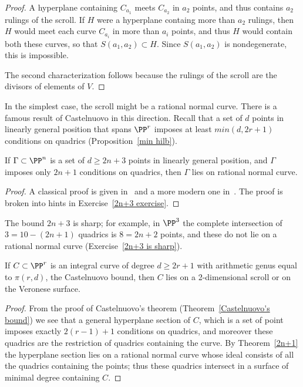 \begin{proof}
A hyperplane containing $C_{a_1}$ meets $C_{a_2}$ in $a_2$
points, and thus contains $a_2$ rulings of the scroll. If $H$ were a hyperplane containg more than $a_2$
rulings, then $H$ would meet each curve $C_{a_i}$ in more than $a_i$ points, and thus $H$ would contain
both these curves, so that $S(a_1,a_2)\subset H$. Since $S(a_1,a_2)$ is nondegenerate, this is impossible.

The second characterization follows because the rulings of the scroll are the divisors of elements of $V.$
\end{proof}

In the simplest case, the scroll might be a rational normal curve. There is a famous result of Castelnuovo
in this direction. Recall that a set of $d$ points in linearly general position that spans $\PP^r$ imposes
at least $min(d, 2r+1)$ conditions on quadrics (Proposition~\ref{min hilb}).

\begin{theorem}\label{2n+3}
If $\Gamma\subset \PP^n$ is a set of $d\geq 2n+3$ points in linearly general position, and $\Gamma$ imposes only
$2n+1$ conditions on quadrics, then $\Gamma$ lies on rational normal curve.
\end{theorem}
\begin{proof}
 A  classical proof is given in~\cite[p.531]{Griffiths-Harris1978} and a more modern one in~\cite[Proposition 3.19]{MR685427}. 
 The proof is broken into hints in Exercise~\ref{2n+3 exercise}.
\end{proof}

The bound $2n+3$ is sharp; for example, in $\PP^3$ the complete intersection of $3 = 10 -(2n+1)$ quadrics
is $8=2n+2$ points, and these do not lie on a rational normal curve (Exercise~\ref{2n+3 is sharp}).


\begin{theorem}\label{Castelnuovo examples}
If $C\subset \PP^r$ is an integral curve of degree $d\geq 2r+1$ with arithmetic genus equal to $\pi(r,d)$, the
Castelnuovo bound, then $C$ lies on a 2-dimensional scroll or on  the Veronese surface.
\end{theorem}

\begin{proof}
From the proof of Castelnuovo's theorem (Theorem~\ref{Castelnuovo's bound}) we see that a general hyperplane
section of $C$, which is a set of point imposes exactly $2(r-1)+1$ conditions on quadrics, and moreover these
quadrics are the restriction of quadrics containing the curve. By Theorem~\ref{2n+1} the hyperplane
section lies on a rational normal curve whose ideal consists of all the quadrics containing the points;
thus these quadrics intersect in a surface of minimal degree containing $C$.
\end{proof}

